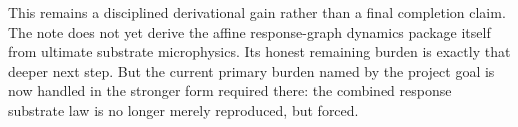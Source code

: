 \documentclass[11pt]{article}
\begin{document}
This remains a disciplined derivational gain rather than a final completion claim. The note does not yet derive the affine response-graph dynamics package itself from ultimate substrate microphysics. Its honest remaining burden is exactly that deeper next step. But the current primary burden named by the project goal is now handled in the stronger form required there: the combined response substrate law is no longer merely reproduced, but forced.
\end{document}
